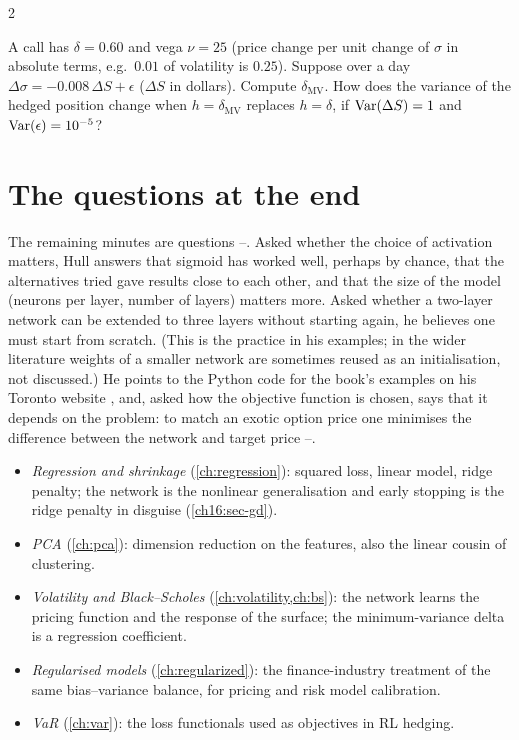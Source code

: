 \begin{paracol}{2}
\begin{exercise}
A call has $\delta=0.60$ and vega $\nu=25$ (price change per unit change of $\sigma$ in absolute terms, e.g.\ $0.01$ of volatility is $0.25$). Suppose over a day $\Delta\sigma=-0.008\,\Delta S+\epsilon$ ($\Delta S$ in dollars). Compute $\delta_{\mathrm{MV}}$.
How does the variance of the hedged position change when $h=\delta_{\mathrm{MV}}$ replaces $h=\delta$, if $\operatorname{Var}(\Delta S)=1$ and $\operatorname{Var}(\epsilon)=10^{-5}$?
\end{exercise}

\section{The questions at the end}
The remaining minutes are questions --. Asked whether the choice of activation matters, Hull answers that sigmoid has worked well, perhaps by chance, that the alternatives tried gave results close to each other, and that the size of the model (neurons per layer, number of layers) matters more.
Asked whether a two-layer network can be extended to three layers without starting again, he believes one must start from scratch. (This is the practice in his examples; in the wider literature weights of a smaller network are sometimes reused as an initialisation, not discussed.) He points to the Python code for the book's examples on his
Toronto website , and, asked how the objective function is chosen, says that it depends on the problem: to match an exotic option price one minimises the difference between the network and target price --.

\begin{finance}
\begin{itemize}
  \item \emph{Regression and shrinkage} (\cref{ch:regression}): squared loss, linear model, ridge penalty; the network is the nonlinear generalisation and early stopping is the ridge penalty in disguise (\cref{ch16:sec-gd}).
  \item \emph{PCA} (\cref{ch:pca}): dimension reduction on the features, also the linear cousin of clustering.
  \item \emph{Volatility and Black--Scholes} (\cref{ch:volatility,ch:bs}): the network learns the pricing function and the response of the surface; the minimum-variance delta is a regression coefficient.
  \item \emph{Regularised models} (\cref{ch:regularized}): the finance-industry treatment of the same bias--variance balance, for pricing and risk model calibration.
  \item \emph{VaR} (\cref{ch:var}): the loss functionals used as objectives in RL hedging.
\end{itemize}
\end{finance}


\end{paracol}
